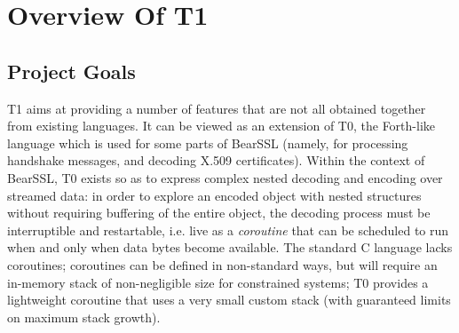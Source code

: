 \section{Overview Of T1}

\subsection{Project Goals}

T1 aims at providing a number of features that are not all obtained
together from existing languages. It can be viewed as an extension of
T0, the Forth-like language which is used for some parts of BearSSL
(namely, for processing handshake messages, and decoding X.509
certificates). Within the context of BearSSL, T0 exists so as to express
complex nested decoding and encoding over streamed data: in order to
explore an encoded object with nested structures without requiring
buffering of the entire object, the decoding process must be
interruptible and restartable, i.e. live as a \emph{coroutine} that can
be scheduled to run when and only when data bytes become available. The
standard C language lacks coroutines; coroutines can be defined in
non-standard ways, but will require an in-memory stack of non-negligible
size for constrained systems; T0 provides a lightweight coroutine that
uses a very small custom stack (with guaranteed limits on maximum stack
growth).

